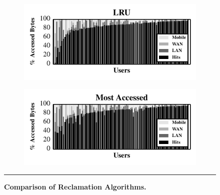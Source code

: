 \begin{figure}[t]
\begin{subfigure}[t]{0.5\columnwidth}
    \includegraphics[width=\columnwidth]{./figures/pocketlocker/LRUSimulatorPerformanceGraph.pdf}

  \end{subfigure}%
  \begin{subfigure}[t]{0.5\columnwidth}

    \includegraphics[width=\columnwidth]{./figures/pocketlocker/AccessSimulatorPerformanceGraph.pdf}

  \end{subfigure}

  \vspace*{-0.1in}

  \caption{\small \textbf{Comparison of Reclamation Algorithms.}}

  \label{fig-simulation-policy}
  
  \vspace*{0.05in}
  
  \hrule
  
  \vspace*{-0.2in}

\end{figure}

